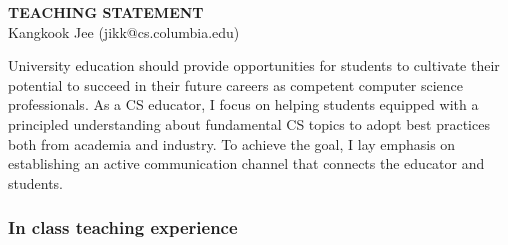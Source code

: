 \documentclass[letterpaper, 10pt]{article}
\begin{document}
\thispagestyle{fancy}

\lhead{}
\rhead{}

\renewcommand{\headrulewidth}{0pt} 
\renewcommand{\footrulewidth}{0pt} 

\fancyfoot[C]{\footnotesize
        \textcolor{gray}{http://www.cs.columbia.edu/$\sim$jikk/application}} 

\pagestyle{fancy}
\lhead{\textcolor{gray}{\it Kangkook Jee}}
\rhead{\textcolor{gray}{\thepage /\pageref{LastPage}}}

\begin{small}

\begin{center} {\LARGE \bf TEACHING STATEMENT}\\ \vspace*{0.1cm} {\normalsize
Kangkook Jee (jikk@cs.columbia.edu)} \end{center}
University education should provide opportunities for students to cultivate
their potential to succeed in their future careers as competent computer
science professionals.  
%
As a CS educator, I focus on helping students equipped with a principled
understanding about fundamental CS topics to adopt best practices both from
academia and industry.
%
To achieve the goal, I lay emphasis on establishing an active communication
channel that connects the educator and students.

\vspace{-2pt}
\subsubsection*{In class teaching experience}


\end{small}
\end{document}
